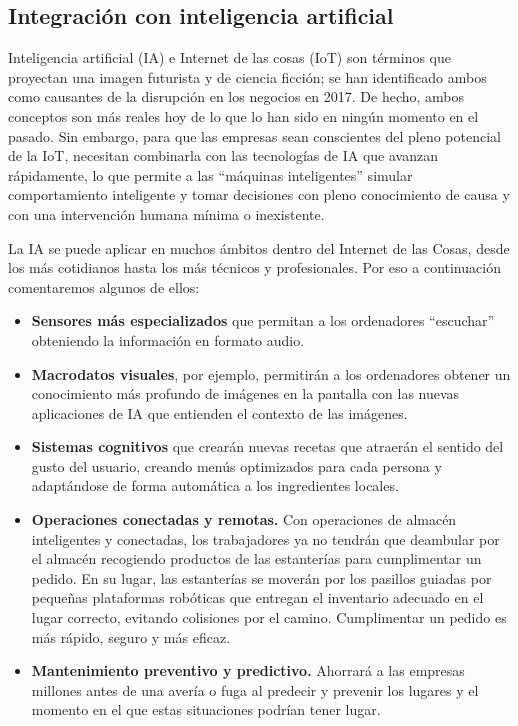 \documentclass[12pt]{article}
\begin{document}
  \subsection*{Integración con inteligencia artificial}
  Inteligencia artificial (IA) e Internet de las cosas (IoT) son términos que proyectan una imagen futurista y de ciencia ficción; se han identificado ambos como causantes de la disrupción en los negocios en 2017. De hecho, ambos conceptos son más reales hoy de lo que lo han sido en ningún momento en el pasado. Sin embargo, para que las empresas sean conscientes del pleno potencial de la IoT, necesitan combinarla con las tecnologías de IA que avanzan rápidamente, lo que permite a las ``máquinas inteligentes'' simular comportamiento inteligente y tomar decisiones con pleno conocimiento de causa y con una intervención humana mínima o inexistente.

  La IA se puede aplicar en muchos ámbitos dentro del Internet de las Cosas, desde los más cotidianos hasta los más técnicos y profesionales. Por eso a continuación comentaremos algunos de ellos:

  \begin{itemize}
    \item \textbf{Sensores más especializados} que permitan a los ordenadores ``escuchar'' obteniendo la información en formato audio.
    \item \textbf{Macrodatos visuales}, por ejemplo, permitirán a los ordenadores obtener un conocimiento más profundo de imágenes en la pantalla con las nuevas aplicaciones de IA que entienden el contexto de las imágenes.
    \item \textbf{Sistemas cognitivos} que crearán nuevas recetas que atraerán el sentido del gusto del usuario, creando menús optimizados para cada persona y adaptándose de forma automática a los ingredientes locales.
    \item \textbf{Operaciones conectadas y remotas.} Con operaciones de almacén inteligentes y conectadas, los trabajadores ya no tendrán que deambular por el almacén recogiendo productos de las estanterías para cumplimentar un pedido. En su lugar, las estanterías se moverán por los pasillos guiadas por pequeñas plataformas robóticas que entregan el inventario adecuado en el lugar correcto, evitando colisiones por el camino. Cumplimentar un pedido es más rápido, seguro y más eficaz.
    \item \textbf{Mantenimiento preventivo y predictivo.} Ahorrará a las empresas millones antes de una avería o fuga al predecir y prevenir los lugares y el momento en el que estas situaciones podrían tener lugar.
  \end{itemize}
  
\end{document}
